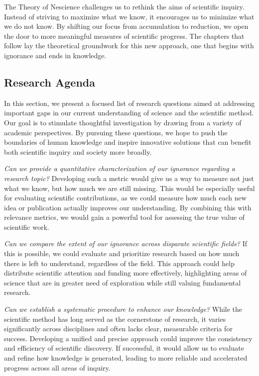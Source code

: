 \medskip

The Theory of Nescience challenges us to rethink the aims of scientific inquiry. Instead of striving to maximize what we know, it encourages us to minimize what we do not know. By shifting our focus from accumulation to reduction, we open the door to more meaningful measures of scientific progress. The chapters that follow lay the theoretical groundwork for this new approach, one that begins with ignorance and ends in knowledge.

%
%

\subsection*{Research Agenda}

In this section, we present a focused list of research questions aimed at addressing important gaps in our current understanding of science and the scientific method. Our goal is to stimulate thoughtful investigation by drawing from a variety of academic perspectives. By pursuing these questions, we hope to push the boundaries of human knowledge and inspire innovative solutions that can benefit both scientific inquiry and society more broadly.

\emph{Can we provide a quantitative characterization of our ignorance regarding a research topic?} Developing such a metric would give us a way to measure not just what we know, but how much we are still missing. This would be especially useful for evaluating scientific contributions, as we could measure how much each new idea or publication actually improves our understanding. By combining this with relevance metrics, we would gain a powerful tool for assessing the true value of scientific work.

\emph{Can we compare the extent of our ignorance across disparate scientific fields?} If this is possible, we could evaluate and prioritize research based on how much there is left to understand, regardless of the field. This approach could help distribute scientific attention and funding more effectively, highlighting areas of science that are in greater need of exploration while still valuing fundamental research.

\emph{Can we establish a systematic procedure to enhance our knowledge?} While the scientific method has long served as the cornerstone of research, it varies significantly across disciplines and often lacks clear, measurable criteria for success. Developing a unified and precise approach could improve the consistency and efficiency of scientific discovery. If successful, it would allow us to evaluate and refine how knowledge is generated, leading to more reliable and accelerated progress across all areas of inquiry.

